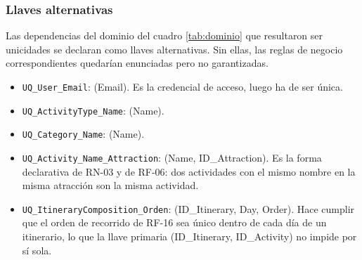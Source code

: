 \documentclass[11pt,a4paper]{article}
\begin{document}
\subsubsection*{Llaves alternativas}
Las dependencias del dominio del cuadro \ref{tab:dominio} que resultaron ser unicidades se declaran como llaves alternativas. Sin ellas, las reglas de negocio correspondientes quedarían enunciadas pero no garantizadas.

\begin{itemize}[leftmargin=1.2em,itemsep=2pt,topsep=3pt]
\item \texttt{UQ\_\allowbreak{}User\_\allowbreak{}Email}: (Email). Es la credencial de acceso, luego ha de ser única.
\item \texttt{UQ\_\allowbreak{}ActivityType\_\allowbreak{}Name}: (Name).
\item \texttt{UQ\_\allowbreak{}Category\_\allowbreak{}Name}: (Name).
\item \texttt{UQ\_\allowbreak{}Activity\_\allowbreak{}Name\_\allowbreak{}Attraction}: (Name, ID\_Attraction). Es la forma declarativa de RN-03 y de RF-06: dos actividades con el mismo nombre en la misma atracción son la misma actividad.
\item \texttt{UQ\_\allowbreak{}ItineraryComposition\_\allowbreak{}Orden}: (ID\_Itinerary, Day, Order). Hace cumplir que el orden de recorrido de RF-16 sea único dentro de cada día de un itinerario, lo que la llave primaria (ID\_Itinerary, ID\_Activity) no impide por sí sola.
\end{itemize}
\end{document}
